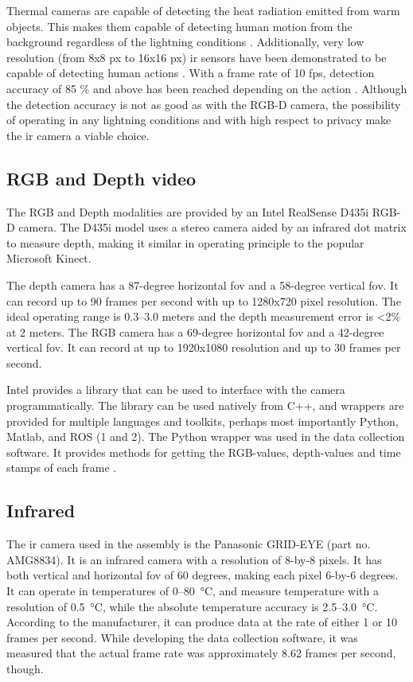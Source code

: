 Thermal cameras are capable of detecting the heat radiation emitted from warm objects.
This makes them capable of detecting human motion from the background regardless of the lightning conditions \cite{han05}.
Additionally, very low resolution (from 8x8 px to 16x16 px) \gls{ir} sensors
have been demonstrated to be capable of detecting human actions \cite{10.1145/2632048.2636084}.
With a frame rate of 10 fps, detection accuracy of 85 \% and above has been reached depending on the action \cite{sensing-survey, tao18}.
Although the detection accuracy is not as good as with the RGB-D camera,
the possibility of operating in any lightning conditions and with high respect to privacy
make the \gls{ir} camera a viable choice.

\subsection{RGB and Depth video}
The RGB and Depth modalities are provided by an Intel RealSense D435i RGB-D camera.
The D435i model uses a stereo camera aided by an infrared dot matrix to measure depth,
making it similar in operating principle to the popular Microsoft Kinect.

The depth camera has a 87-degree horizontal \gls{fov} and a 58-degree vertical \gls{fov}.
It can record up to 90 frames per second with up to 1280x720 pixel resolution.
The ideal operating range is 0.3--3.0 meters and the depth measurement error is <2\% at 2 meters.
The RGB camera has a 69-degree horizontal \gls{fov} and a 42-degree vertical \gls{fov}.
It can record at up to 1920x1080 resolution and up to 30 frames per second. \cite{realsense-datasheet}

Intel provides a library that can be used to interface with the camera programmatically.
The library can be used natively from C++,
and wrappers are provided for multiple languages and toolkits,
perhaps most importantly Python, Matlab, and ROS (1 and 2).
\cite{librealsense2}
The Python wrapper was used in the data collection software.
It provides methods for getting the RGB-values, depth-values and time stamps of each frame \cite{librealsense2-python-docs}.
 
\subsection{Infrared}
The \gls{ir} camera used in the assembly is the Panasonic GRID-EYE (part no. AMG8834).
It is an infrared camera with a resolution of 8-by-8 pixels.
It has both vertical and horizontal \gls{fov} of 60 degrees,
making each pixel 6-by-6 degrees.
It can operate in temperatures of 0--\SI{80}{\celsius},
and measure temperature with a resolution of \SI{0.5}{\celsius},
while the absolute temperature accuracy is 2.5--\SI{3.0}{\celsius}.
According to the manufacturer,
it can produce data at the rate of either 1 or 10 frames per second. \cite{grid-eye-manual}
While developing the data collection software,
it was measured that the actual frame rate was approximately 8.62 frames per second, though.

